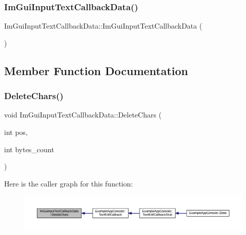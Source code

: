 \subsubsection{\texorpdfstring{Im\+Gui\+Input\+Text\+Callback\+Data()}{ImGuiInputTextCallbackData()}}
{\footnotesize\ttfamily Im\+Gui\+Input\+Text\+Callback\+Data\+::\+Im\+Gui\+Input\+Text\+Callback\+Data (\begin{DoxyParamCaption}{ }\end{DoxyParamCaption})}



\subsection{Member Function Documentation}
\mbox{\label{struct_im_gui_input_text_callback_data_ab5dc30d7edcf60efbd5bb8e677dab8bf}} 
\subsubsection{\texorpdfstring{Delete\+Chars()}{DeleteChars()}}
{\footnotesize\ttfamily void Im\+Gui\+Input\+Text\+Callback\+Data\+::\+Delete\+Chars (\begin{DoxyParamCaption}\item[{int}]{pos,  }\item[{int}]{bytes\+\_\+count }\end{DoxyParamCaption})}

Here is the caller graph for this function\+:
\nopagebreak
\begin{figure}[H]
\begin{center}
\leavevmode
\includegraphics[width=350pt]{struct_im_gui_input_text_callback_data_ab5dc30d7edcf60efbd5bb8e677dab8bf_icgraph}
\end{center}
\end{figure}
\mbox{\label{struct_im_gui_input_text_callback_data_aae1b69a904053961be171d7f47ef430e}} 
